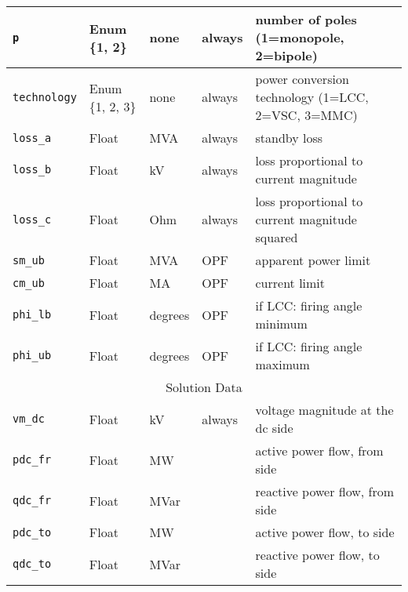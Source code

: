 \documentclass{article}
\begin{document}
\begin{table}[h]
\begin{tabular}{|l|l|l|l|p{7cm}|}
\hline
\texttt{p} & Enum \{1, 2\} & none & always & number of poles (1=monopole, 2=bipole) \\
\hline
\texttt{technology} &  Enum \{1, 2, 3\} & none & always & power conversion technology (1=LCC, 2=VSC, 3=MMC) \\
\hline
\texttt{loss\_a} & Float & MVA & always & standby loss \\
\hline
\texttt{loss\_b} & Float & kV & always & loss proportional to current magnitude \\
\hline
\texttt{loss\_c} & Float & Ohm & always & loss proportional to current magnitude squared \\
\hline
\texttt{sm\_ub} & Float & MVA & OPF &  apparent power limit \\ 
\hline
\texttt{cm\_ub} & Float & MA & OPF &  current limit \\ 
\hline
\texttt{phi\_lb} & Float & degrees & OPF & if LCC: firing angle minimum  \\ 
\hline
\texttt{phi\_ub} & Float & degrees & OPF & if LCC: firing angle maximum  \\ 
\hline
%
\hline
\multicolumn{5}{|c|}{Solution Data} \\
\hline
\texttt{vm\_dc} & Float & kV & always & voltage magnitude at the dc side \\ 
\hline
\texttt{pdc\_fr} & Float & MW &  & active power flow, from side \\ 
\hline
\texttt{qdc\_fr} & Float & MVar &  & reactive power flow, from side \\ 
\hline
\texttt{pdc\_to} & Float & MW &  & active power flow, to side \\ 
\hline
\texttt{qdc\_to} & Float & MVar &  & reactive power flow, to side \\
\hline
\end{tabular}
\label{tbl:tbd}
\end{table}
\end{document}
